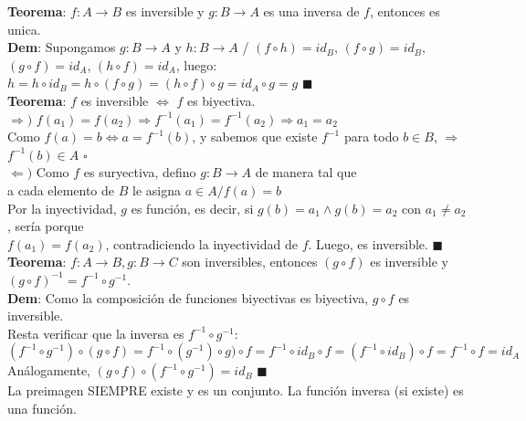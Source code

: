 \documentclass[11pt,a4paper]{article}
\newcommand*{\QEDA}{\null\nobreak\hfill\ensuremath{\blacksquare}}
\newcommand*{\QEDB}{\null\nobreak\hfill\ensuremath{\square}}
\begin{document}
\noindent \textbf{Teorema}: $f : A \rightarrow B$ es inversible y $g : B \rightarrow A$ es una inversa de $f$, entonces es unica.\\
\textbf{Dem}: Supongamos $g:B \rightarrow A$ y $h:B \rightarrow A$ / $(f \circ h) = id_B$, $(f \circ g) = id_B$, $(g \circ f) = id_A$, $(h \circ f) = id_A$, luego: $h = h \circ id_B = h \circ (f \circ g) = (h \circ f) \circ g = id_A \circ g = g$ \QEDA\\

\noindent \textbf{Teorema}: $f$ es inversible $\iff$ $f$ es biyectiva.\\
$\Rightarrow)$ $f(a_1)=f(a_2) \Rightarrow f^{-1}(a_1) = f^{-1}(a_2) \Rightarrow a_1=a_2$\\
\indent Como $f(a)=b \iff a = f^{-1}(b)$, y sabemos que existe $f^{-1}$ para todo $b \in B$, $\Rightarrow$ $f^{-1}(b) \in A$ \QEDB\\
$\Leftarrow)$ Como $f$ es suryectiva, defino $g:B\rightarrow A$ de manera tal que\\ \indent a cada elemento de $B$ le asigna $a\in A / f(a)=b$\\
\indent Por la inyectividad, $g$ es funci\'on, es decir, si $g(b)=a_1 \land g(b)=a_2$ con $a_1\not=a_2$, ser\'ia porque \\ \indent $f(a_1)=f(a_2)$, contradiciendo la inyectividad de $f$. Luego, es inversible. \QEDA\\

\noindent \textbf{Teorema}: $f : A \rightarrow B, g: B \rightarrow C$ son inversibles, entonces $(g \circ f)$ es inversible y $(g \circ f)^{-1} = f^{-1} \circ g^{-1}$.\\
\textbf{Dem}: Como la composici\'on de funciones biyectivas es biyectiva, $g\circ f$ es inversible.\\ Resta verificar que la inversa es $f^{-1} \circ g^{-1}$: \\
$(f^{-1} \circ g^{-1})\circ(g \circ f) = f^{-1} \circ (g^{-1})\circ g) \circ f = f^{-1} \circ id_B \circ f = (f^{-1} \circ id_B) \circ f = f^{-1} \circ f = id_A$\\
An\'alogamente, $(g \circ f) \circ (f^{-1} \circ g^{-1}) = id_B$ \QEDA\\

\noindent La preimagen SIEMPRE existe y es un conjunto. La funci\'on inversa (si existe) es una funci\'on.\\
\end{document}

